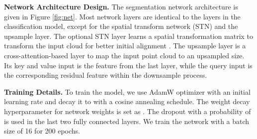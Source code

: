 \documentclass[10pt,twocolumn,letterpaper]{article}
\begin{document}
\textbf{Network Architecture Design.}
The segmentation network architecture is given in Figure \ref{fig:net}.
Most network layers are identical to the layers in the classification model, except for the spatial transform network (STN) and the upsample layer. 
The optional STN layer learns a spatial transformation matrix to transform the input cloud for better initial alignment \cite{Qi2017PointNetDL, Wang2019DynamicGC}. 
The upsample layer is a cross-attention-based layer to map the input point cloud to an upsampled size. Its key and value input is the feature from the last layer, while the query input is the corresponding residual feature within the downsample process.

\textbf{Training Details.}
To train the model, we use AdamW optimizer with an initial
learning rate  and decay it to  with a cosine annealing schedule. The weight decay hyperparameter for network weights is set as . The dropout with a probability of  is used in the last two fully connected layers. 
We train the network with a batch size of 16 for 200 epochs.

\begin{table}[t]
\centering
{}
\caption{Segmentation results on ShapeNet Part.}
\label{table:seg}
\end{table}
\end{document}

